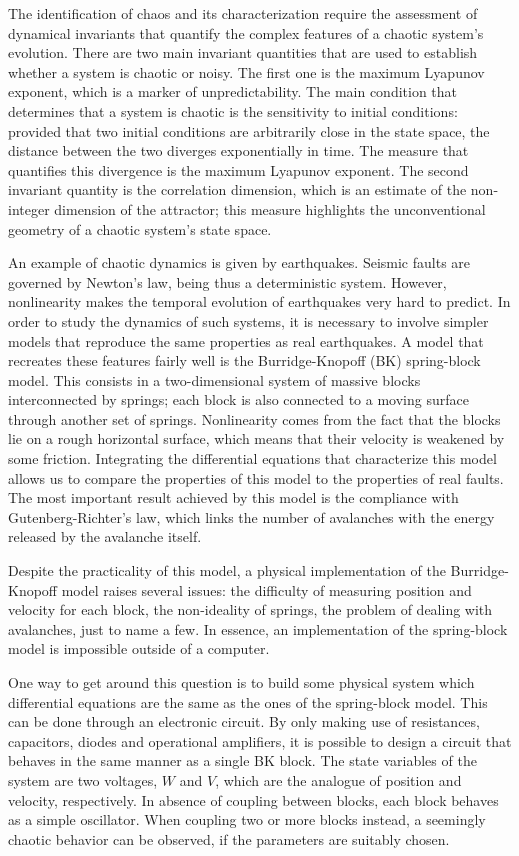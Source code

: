 The identification of chaos and its characterization require the assessment of dynamical invariants
that quantify the complex features of a chaotic system's evolution. There are two main invariant
quantities that are used to establish whether a system is chaotic or noisy.
The first one is the maximum Lyapunov exponent, which is a marker of unpredictability. The main
condition that determines that a system is chaotic is the sensitivity to initial conditions:
provided that two initial conditions are arbitrarily close in the state space, the distance
between the two diverges exponentially in time. The measure that quantifies this divergence is the
maximum Lyapunov exponent. The second invariant quantity is the correlation dimension, which is an
estimate of the non-integer dimension of the attractor; this measure highlights the unconventional
geometry of a chaotic system's state space.

An example of chaotic dynamics is given by earthquakes. Seismic faults are governed by Newton's law,
being thus a deterministic system. However, nonlinearity makes the temporal evolution of earthquakes
very hard to predict. In order to study the dynamics of such systems, it is necessary to involve
simpler models that reproduce the same properties as real earthquakes. A model that recreates these
features fairly well is the Burridge-Knopoff (BK) spring-block model. This consists in a two-dimensional
system of massive blocks interconnected by springs; each block is also connected to a moving surface
through another set of springs. Nonlinearity comes from the fact that the blocks lie on a rough
horizontal surface, which means that their velocity is weakened by some friction. Integrating the
differential equations that characterize this model allows us to compare the properties of this model
to the properties of real faults. The most important result achieved by this model is the
compliance with Gutenberg-Richter's law, which links the number of avalanches with the energy
released by the avalanche itself.

Despite the practicality of this model, a physical implementation of the Burridge-Knopoff model raises
several issues: the difficulty of measuring position and velocity for each block, the non-ideality
of springs, the problem of dealing with avalanches, just to name a few. In essence, an implementation
of the spring-block model is impossible outside of a computer.

One way to get around this question is to build some physical system which differential equations
are the same as the ones of the spring-block model. This can be done through an electronic circuit. By only
making use of resistances, capacitors, diodes and operational amplifiers, it is possible to design
a circuit that behaves in the same manner as a single BK block. The state variables
of the system are two voltages, $W$ and $V$, which are the analogue of position and velocity, respectively.
In absence of coupling between blocks, each block behaves as a simple oscillator. When coupling two or
more blocks instead, a seemingly chaotic behavior can be observed, if the parameters are suitably
chosen.

